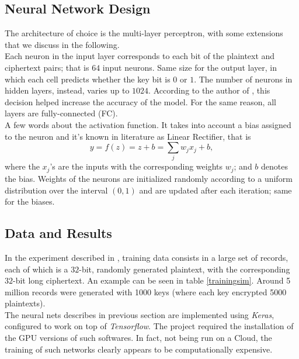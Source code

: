 \documentclass[%
    corpo=11pt,
    twoside,
    stile=classica,
    oldstyle,
    autoretitolo,
    tipotesi=magistrale,
    greek,
    evenboxes,
    english
]{toptesi}
\begin{document}
\subsection{Neural Network Design}
The architecture of choice is the multi-layer perceptron, with some extensions that we discuss in the following. \\
Each neuron in the input layer corresponds to each bit of the plaintext and ciphertext pairs; that is $64$ input neurons. Same size for the output layer, in which each cell predicts whether the key bit is $0$ or $1$. The number of neurons in hidden layers, instead, varies up to $1024$. According to the author of \cite{jay}, this decision helped increase the accuracy of the model. For the same reason, all layers are fully-connected (FC).\\
A few words about the activation function. It takes into account a bias assigned to the neuron and it's known in literature as Linear Rectifier, that is 
\begin{equation}
y = f(z)= z + b = \sum_j w_jx_j + b,
\end{equation}
where the $x_j$'s are the inputs with the corresponding weights $w_j$; and $b$ denotes the bias. Weights of the neurons are initialized randomly according to a uniform distribution over the interval $(0,1)$ and are updated after each iteration; same for the biases.

\subsection{Data and Results}
In the experiment described in \cite{jay}, training data consists in a large set of records, each of which is a $32$-bit, randomly generated plaintext, with the corresponding $32$-bit long ciphertext. An example can be seen in table \ref{trainingsim}. Around 5 million records were generated with 1000 keys (where each key encrypted 5000 plaintexts). \\
The neural nets describes in previous section are implemented using \textit{Keras}, configured to work on top of \textit{Tensorflow}. The project required the installation of the GPU versions of such softwares. In fact, not being run on a Cloud, the training of such networks clearly appears to be computationally expensive. 
\end{document}

